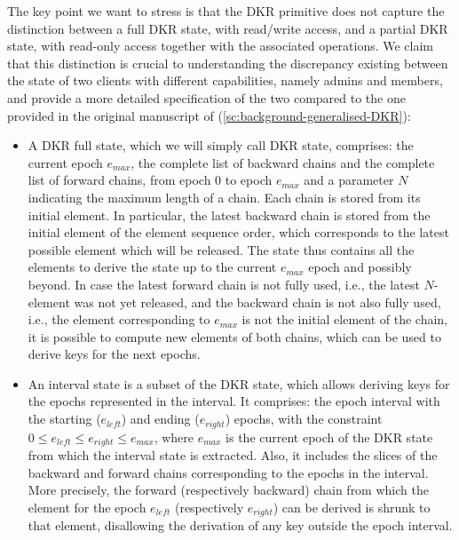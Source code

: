 The key point we want to stress is that the DKR primitive
does not capture the distinction between a full DKR state,
with read/write access, and a partial DKR state, with read-only access
together with the associated operations.
We claim that this distinction is crucial to understanding the discrepancy existing between the state of two clients with different capabilities,
namely admins and members, and provide a more detailed specification
of the two compared to the one provided in the original manuscript of \cite{GKP} (\cref{sc:background-generalised-DKR}):

\begin{itemize}
    \item A DKR full state, which we will simply call DKR state,
    comprises: 
    the current epoch $e_{max}$, 
    the complete list of backward chains
    and the complete list of forward chains,
    from epoch $0$ to epoch $e_{max}$ and 
    a parameter $N$ indicating the maximum length of a chain.
    Each chain is stored from its initial element. 
    In particular, the latest backward chain
    is stored from the initial element of the element sequence order,
    which corresponds to the latest possible element which will be released.
    The state thus contains all the elements to derive the state up to
    the current $e_{max}$ epoch and possibly beyond. 
    In case the latest forward chain is not fully used, i.e.,
    the latest $N$-element was not yet released, and the backward
    chain is not also fully used, i.e., the element
    corresponding to $e_{max}$ is not the initial element of the chain,
    it is possible to compute new elements of both
    chains, which can be used to derive keys for the next epochs.
    \item An interval state is a subset of the DKR state, which
    allows deriving keys for the epochs represented in the interval.
    It comprises: the epoch interval with the starting ($e_{left}$) and ending ($e_{right}$) 
    epochs, with the constraint $0 \leq e_{left} \leq e_{right} \leq e_{max}$,
    where $e_{max}$ is the current epoch of the DKR state from which the interval
    state is extracted. Also, it includes the slices of the backward
    and forward chains corresponding to the epochs in the interval.
    More precisely, the forward (respectively backward) chain from which the
    element for the epoch $e_{left}$ (respectively $e_{right}$) can be derived
    is shrunk to that element, disallowing the derivation of any key outside the epoch interval.
\end{itemize}

